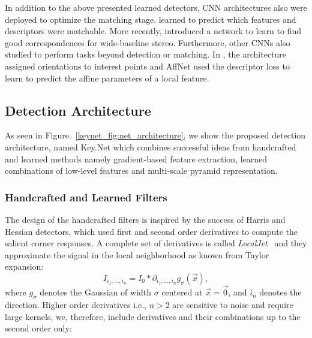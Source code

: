 In addition to the above presented learned detectors, CNN architectures also were deployed to optimize the matching stage. \cite{Hartmann_Havlena_CVPR14} learned to predict which features and descriptors were matchable. More recently, \cite{Yi_Trulls_Good_Corr_CVPR18} introduced a network to learn to find good correspondences for wide-baseline stereo. Furthermore, other CNNs also studied to perform tasks beyond detection or matching. In \cite{Yi_Verdie_Fua_Lepetit_CVPR16}, the architecture assigned orientations to interest points and AffNet \cite{Mishkin_Radenovic_Matas_AffNet_18} used the descriptor loss to learn to predict the affine parameters of a local feature.


\subsection{Detection Architecture}
\label{keynet_sec:architecture}
As seen in Figure.~\ref{keynet_fig:net_architecture}, we show the proposed detection architecture, named Key.Net which combines successful ideas from handcrafted and learned methods namely gradient-based feature extraction, learned combinations of low-level features and multi-scale pyramid representation.


\subsubsection{Handcrafted and Learned Filters}
\label{sec:handcrafted_filters}
The design of the handcrafted filters is inspired by the success of Harris \cite{Harris} and Hessian \cite{Hessian} detectors, which used first and second order derivatives to compute the salient corner responses. A complete set of derivatives is called {\em LocalJet}~\cite{Koendering-FlorackLocalJet} and they approximate the signal in the local neighborhood as known from Taylor expansion:
\begin{equation}
I_{i_1,\ldots,i_n}=I_0\ast\partial_{i_1,\ldots,i_n}g_{\sigma}(\vec{x}),
\label{eq:Taylor}
\end{equation}
where $g_{\sigma}$ denotes the Gaussian of width $\sigma$ centered at $\vec{x}=\vec{0}$, and $i_n$ denotes the direction. Higher order derivatives i.e., $n>2$ are sensitive to noise and require large kernels, we, therefore, include derivatives and their combinations up to the second order only: 

